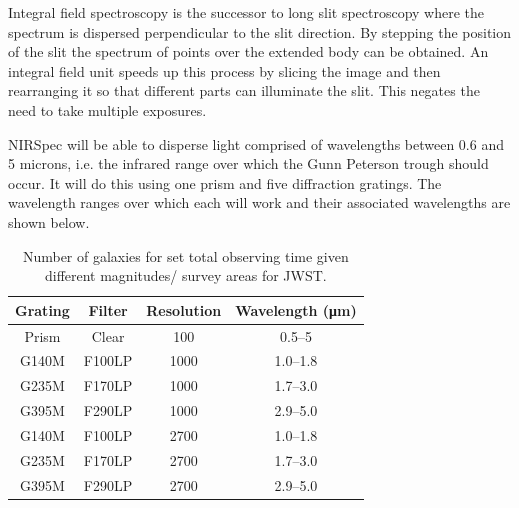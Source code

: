 			Integral field spectroscopy is the successor to long slit spectroscopy where the spectrum is dispersed perpendicular to the slit direction. By stepping the position of the slit the spectrum of points over the extended body can be obtained. An integral field unit speeds up this process by slicing the image and then rearranging it so that different parts can illuminate the slit. This negates the need to take multiple exposures\cite{INTEGRAL_FIELD_UNIT}.

			NIRSpec will be able to disperse light comprised of wavelengths between 0.6 and 5 microns, i.e. the infrared range over which the Gunn Peterson trough should occur. It will do this using one prism and five diffraction gratings. The wavelength ranges over which each will work and their associated wavelengths are shown below.
			\begin{table}[!htbp]
				\begin{center}
					\begin{tabular}{c|c|c|c}
						Grating & Filter & Resolution & Wavelength (\si{\micro\metre}) \\
						\hline \hline
						Prism & Clear & 100 & 0.5--5 \\
						G140M & F100LP & 1000 & 1.0--1.8 \\
						G235M & F170LP & 1000 & 1.7--3.0 \\
						G395M & F290LP & 1000 & 2.9--5.0 \\
						G140M & F100LP & 2700 & 1.0--1.8 \\
						G235M & F170LP & 2700 & 1.7--3.0 \\
						G395M & F290LP & 2700 & 2.9--5.0
					\end{tabular}
				\end{center}
				\caption{Number of galaxies for set total observing time given different magnitudes/ survey areas for JWST.\label{tab:galaxies_for_set_total_observing_time_JWST}}
			\end{table}

